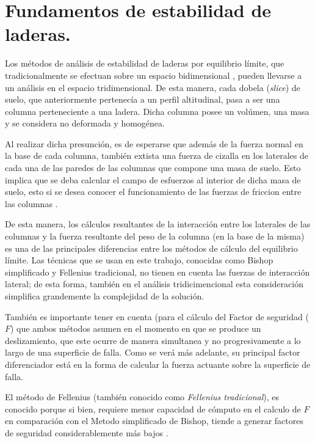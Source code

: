 \chapter{Fundamentos de estabilidad de laderas.}

Los m\'etodos de an\'alisis de estabilidad de laderas por equilibrio l\'imite, que tradicionalmente se efectuan sobre un espacio bidimensional \cite{fredlund1977comparison}, pueden llevarse a un an\'alisis en el espacio tridimensional. 
De esta manera, cada dobela (\textit{slice}) de suelo, que anteriormente pertenec\'ia a un perfil altitudinal, pasa a ser una columna perteneciente a una ladera. Dicha columna posee un vol\'umen, una masa y se considera no deformada y homog\'enea.

Al realizar dicha presunci\'on, es de esperarse que adem\'as de la fuerza normal en la base de cada columna, tambi\'en extista una fuerza de cizalla en los laterales de cada una de las paredes de las columnas que compone una masa de suelo. Esto implica que se deba calcular el campo de esfuerzos al interior de dicha masa de suelo, esto si se desea conocer el funcionamiento de las fuerzas de friccion entre las columnas \cite{reid2015scoops3d}.

De esta manera, los c\'alculos resultantes de la interacci\'on entre los laterales de las columnas y la fuerza resultante del peso de la columna (en la base de la misma) es una de las principales diferencias entre los m\'etodos de c\'alculo del equilibrio l\'imite. Las t\'ecnicas que se usan en este trabajo, conocidas como Bishop simplificado y Fellenius tradicional, no tienen en cuenta las fuerzas de interacci\'on lateral; de esta forma, tambi\'en en el an\'alisis tridicimencional esta consideraci\'on simplifica grandemente la complejidad de la soluci\'on.

Tambi\'en es importante tener en cuenta (para el c\'alculo del Factor de seguridad (\(F\)) que ambos m\'etodos asumen en el momento en que se produce un deslizamiento, que este ocurre de manera simultanea y no progresivamente a lo largo de una superficie de falla. Como se ver\'a m\'as adelante, su principal factor diferenciador est\'a en la forma de calcular la fuerza actuante sobre la superficie de falla.

El m\'etodo de Fellenius (tambi\'en conocido como  \emph{Fellenius tradicional}), es conocido porque si bien, requiere menor capacidad de c\'omputo en el calculo de \(F\) en comparaci\'on con el Metodo simplificado de Bishop, tiende a generar factores de seguridad considerablemente m\'as bajos \cite{traditional}.
